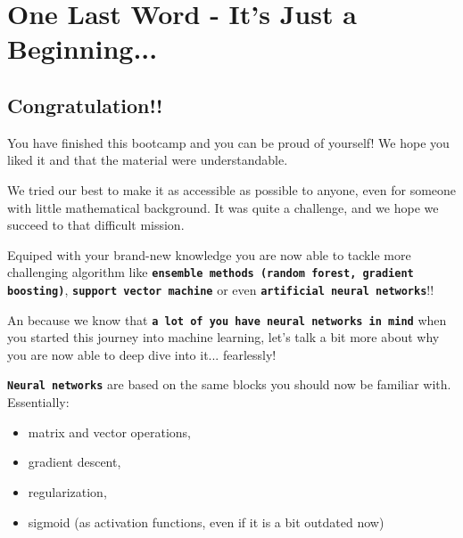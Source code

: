 
\section*{One Last Word - It's Just a Beginning...}
\subsection*{Congratulation!!}
You have finished this bootcamp and you can be proud of yourself!
We hope you liked it and that the material were understandable.

We tried our best to make it as accessible as possible to anyone, even for someone with little mathematical background. It was quite a challenge, and we hope we succeed to that difficult mission.

Equiped with your brand-new knowledge you are now able to tackle more challenging algorithm like \texttt{\textbf{ensemble methods (random forest, gradient boosting)}}, \texttt{\textbf{support vector machine}} or even \texttt{\textbf{artificial neural networks}}!!

An because we know that \texttt{\textbf{a lot of you have neural networks in mind}} when you started this journey into machine learning, let's talk a bit more about why you are now able to deep dive into it... fearlessly!

\texttt{\textbf{Neural networks}} are based on the same blocks you should now be familiar with.
Essentially:
\begin{itemize}
      \item matrix and vector operations,
      \item gradient descent,
      \item regularization,
      \item sigmoid (as activation functions, even if it is a bit outdated now)
\end{itemize}

